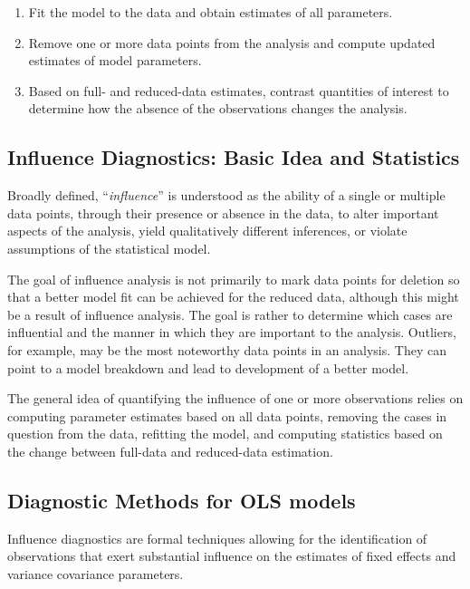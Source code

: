 \documentclass[Main.tex]{subfiles}
\begin{document}
\begin{enumerate}
	\item Fit the model to the data and obtain estimates of all parameters.
	\item Remove one or more data points from the analysis and compute updated estimates of model parameters.
	\item Based on full- and reduced-data estimates, contrast quantities of interest to determine how the absence of the observations changes the analysis.
\end{enumerate}	



\subsection{Influence Diagnostics: Basic Idea and Statistics} %
Broadly defined, ``\textit{influence}” is understood as the ability of a single or multiple data points, through their presence or absence in the data, to alter important aspects of the analysis, yield qualitatively different inferences, or
violate assumptions of the statistical model. 


The goal of influence analysis is not primarily to mark data
points for deletion so that a better model fit can be achieved for the reduced data, although this might be a
result of influence analysis. The goal is rather to determine which cases are influential and the manner in
which they are important to the analysis. Outliers, for example, may be the most noteworthy data points in
an analysis. They can point to a model breakdown and lead to development of a better model.


The general idea of quantifying the influence of one or more observations relies on computing parameter estimates based on all data points, removing the cases in question from the data, refitting the model, and computing statistics based on the change between full-data and reduced-data estimation. 

	\subsection{Diagnostic Methods for OLS models}
	Influence diagnostics are formal techniques allowing for the identification of observations that exert substantial 
	influence on the estimates of fixed effects and variance covariance parameters. 
	
\end{document}
